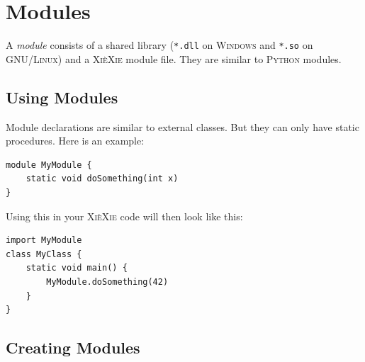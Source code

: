 \documentclass{report}
\def\xiexie{\textsc{Xi\`eXie}\xspace}
\def\python{\textsc{Python}\xspace}
\def\windows{\textsc{Windows}\xspace}
\def\linux{\textsc{GNU/Linux}\xspace}
\begin{document}

\chapter{Modules}
\label{ch:modules}

A \textit{module} consists of a shared library (\texttt{*.dll} on \windows and \texttt{*.so} on \linux)
and a \xiexie module file. They are similar to \python modules.



\section{Using Modules}

Module declarations are similar to external classes. But they can only have static procedures. Here is an example:
\begin{lstlisting}
module MyModule {
    static void doSomething(int x)
}
\end{lstlisting}
Using this in your \xiexie code will then look like this:
\begin{lstlisting}
import MyModule
class MyClass {
    static void main() {
        MyModule.doSomething(42)
    }
}
\end{lstlisting}



\section{Creating Modules}
\end{document}
